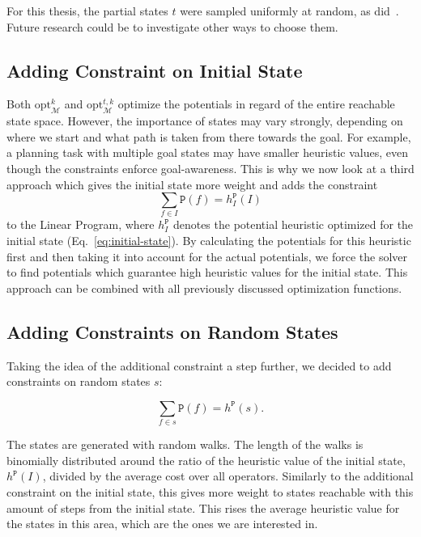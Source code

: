 For this thesis, the partial states $t$ were sampled uniformly at random, as did~\citeauthor{fivser2020strengthening}.
Future research could be to investigate other ways to choose them.

\subsection{Adding Constraint on Initial State}\label{subsec:adding-constraint-on-initial-state}
Both $\mathrm{opt}^k_\mathcal{M}$ and $\mathrm{opt}^{t,k}_\mathcal{M}$ optimize the potentials in regard of the entire reachable state space.
However, the importance of states may vary strongly, depending on where we start and what path is taken from there towards the goal.
For example, a planning task with multiple goal states may have smaller heuristic values, even though the constraints enforce goal-awareness.
This is why we now look at a third approach which gives the initial state more weight and adds the constraint  \begin{equation}\sum_{f\in I}\mathtt{P}(f)=h^\mathtt{P}_I (I)\end{equation} to the Linear Program, where $h^\mathtt{P}_I$ denotes the potential heuristic optimized for the initial state (Eq.~\eqref{eq:initial-state}).
By calculating the potentials for this heuristic first and then taking it into account for the actual potentials, we force the solver to find potentials which guarantee high heuristic values for the initial state.
This approach can be combined with all previously discussed optimization functions.

\subsection{Adding Constraints on Random States}\label{subsec:adding-constraints-on-random-states}
Taking the idea of the additional constraint a step further, we decided to add constraints on random states $s$:

\begin{equation}\sum_{f\in s}\mathtt{P}(f)=h^\mathtt{P}(s).\end{equation}

The states are generated with random walks.
The length of the walks is binomially distributed around the ratio of the heuristic value of the initial state, $h^\mathtt{P}(I)$, divided by the average cost over all operators.
Similarly to the additional constraint on the initial state, this gives more weight to states reachable with this amount of steps from the initial state.
This rises the average heuristic value for the states in this area, which are the ones we are interested in.

